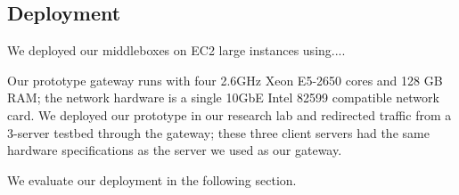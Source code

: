 \subsection{Deployment}
\label{sec:deployment}

We deployed our middleboxes on EC2 large instances using.... 

Our prototype gateway runs with four 2.6GHz Xeon E5-2650 cores and 128 GB RAM; the network hardware is a single 10GbE Intel 82599 compatible network card.
We deployed our prototype in our research lab and redirected traffic from a 3-server testbed through the gateway; these three client servers had the same hardware specifications as the server we used as our gateway.

We evaluate our deployment in the following section.


